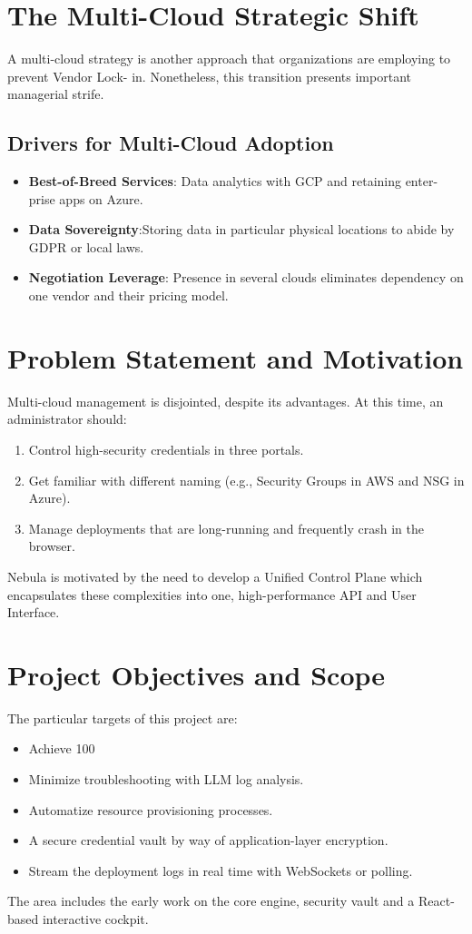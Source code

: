 \section{The Multi-Cloud Strategic Shift}
A multi-cloud strategy is another approach that organizations are employing to prevent Vendor Lock- in. Nonetheless, this transition presents important managerial strife. 

\subsection{Drivers for Multi-Cloud Adoption}
\begin{itemize}
    \item \textbf{Best-of-Breed Services}: Data analytics with GCP and retaining enter- prise apps on Azure.
    \item \textbf{Data Sovereignty}:Storing data in particular physical locations to abide by GDPR or local laws.
    \item \textbf{Negotiation Leverage}: Presence in several clouds eliminates dependency on one vendor and their pricing model.
\end{itemize}

\section{Problem Statement and Motivation}
Multi-cloud management is disjointed, despite its advantages. At this time, an administrator should:
\begin{enumerate}
    \item Control high-security credentials in three portals.
    \item Get familiar with different naming (e.g., Security Groups in AWS and NSG in Azure).
    \item Manage deployments that are long-running and frequently crash in the browser.

\end{enumerate}
Nebula is motivated by the need to develop a Unified Control Plane which encapsulates these complexities into one, high-performance API and User Interface.

\section{Project Objectives and Scope}
The particular targets of this project are:
\begin{itemize}
    \item Achieve 100%
    \item Minimize troubleshooting with LLM log analysis.
    \item Automatize resource provisioning processes.
    \item A secure credential vault by way of application-layer encryption.
    \item Stream the deployment logs in real time with WebSockets or polling.
\end{itemize}
The area includes the early work on the core engine, security vault and a React-based interactive cockpit.

\newpage
